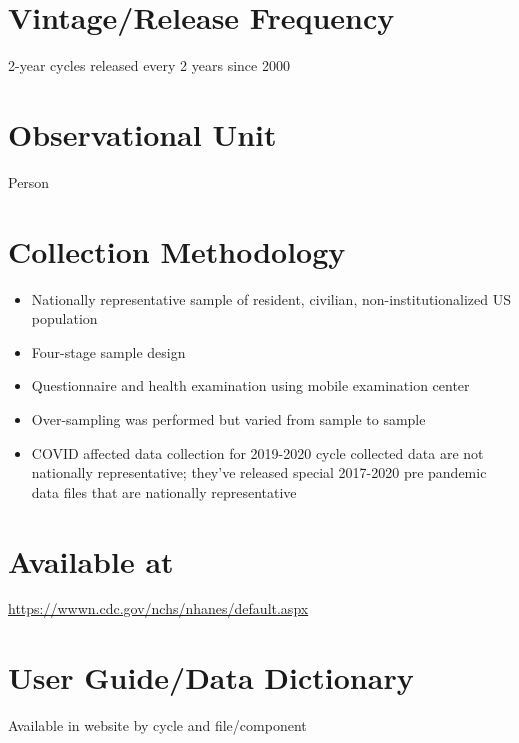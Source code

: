 \documentclass[
]{book}
\providecommand{\tightlist}{%
  \setlength{\itemsep}{0pt}\setlength{\parskip}{0pt}}
\begin{document}
\hypertarget{vintagerelease-frequency-50}{%
\section{Vintage/Release Frequency}\label{vintagerelease-frequency-50}}

2-year cycles released every 2 years since 2000

\hypertarget{observational-unit-50}{%
\section{Observational Unit}\label{observational-unit-50}}

Person

\hypertarget{collection-methodology-50}{%
\section{Collection Methodology}\label{collection-methodology-50}}

\begin{itemize}
\tightlist
\item
  Nationally representative sample of resident, civilian, non-institutionalized US population
\item
  Four-stage sample design
\item
  Questionnaire and health examination using mobile examination center
\item
  Over-sampling was performed but varied from sample to sample
\item
  COVID affected data collection for 2019-2020 cycle collected data are not nationally representative; they've released special 2017-2020 pre pandemic data files that are nationally representative
\end{itemize}

\hypertarget{available-at-50}{%
\section{Available at}\label{available-at-50}}

\url{https://wwwn.cdc.gov/nchs/nhanes/default.aspx}

\hypertarget{user-guidedata-dictionary-50}{%
\section{User Guide/Data Dictionary}\label{user-guidedata-dictionary-50}}

Available in website by cycle and file/component
\end{document}
